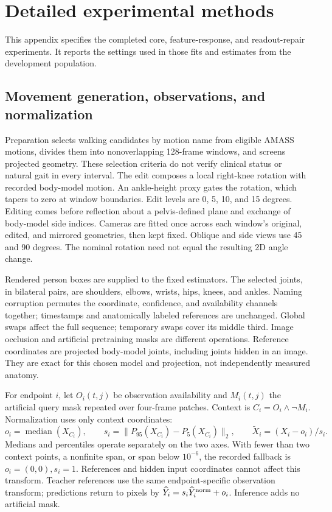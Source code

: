 \section{Detailed experimental methods}
\label{app:methods}
This appendix specifies the completed core, feature-response, and readout-repair experiments. It reports the settings used in those fits and estimates from the development population.

\subsection{Movement generation, observations, and normalization}
Preparation selects walking candidates by motion name from eligible AMASS motions, divides them into nonoverlapping 128-frame windows, and screens projected geometry. These selection criteria do not verify clinical status or natural gait in every interval. The edit composes a local right-knee rotation with recorded body-model motion. An ankle-height proxy gates the rotation, which tapers to zero at window boundaries. Edit levels are 0, 5, 10, and 15 degrees. Editing comes before reflection about a pelvis-defined plane and exchange of body-model side indices. Cameras are fitted once across each window's original, edited, and mirrored geometries, then kept fixed. Oblique and side views use 45 and 90 degrees. The nominal rotation need not equal the resulting 2D angle change.

Rendered person boxes are supplied to the fixed estimators. The selected joints, in bilateral pairs, are shoulders, elbows, wrists, hips, knees, and ankles. Naming corruption permutes the coordinate, confidence, and availability channels together; timestamps and anatomically labeled references are unchanged. Global swaps affect the full sequence; temporary swaps cover its middle third. Image occlusion and artificial pretraining masks are different operations. Reference coordinates are projected body-model joints, including joints hidden in an image. They are exact for this chosen model and projection, not independently measured anatomy.

For endpoint $i$, let $O_i(t,j)$ be observation availability and $M_i(t,j)$ the artificial query mask repeated over four-frame patches. Context is $C_i=O_i\wedge\neg M_i$. Normalization uses only context coordinates:
\begin{equation}
o_i=\operatorname{median}(X_{C_i}),\qquad
s_i=\|P_{95}(X_{C_i})-P_5(X_{C_i})\|_2,\qquad
\widetilde X_i=(X_i-o_i)/s_i.
\end{equation}
Medians and percentiles operate separately on the two axes. With fewer than two context points, a nonfinite span, or span below $10^{-6}$, the recorded fallback is $o_i=(0,0),s_i=1$. References and hidden input coordinates cannot affect this transform. Teacher references use the same endpoint-specific observation transform; predictions return to pixels by $\widehat Y_i=s_i\widehat Y_i^{\rm norm}+o_i$. Inference adds no artificial mask.

